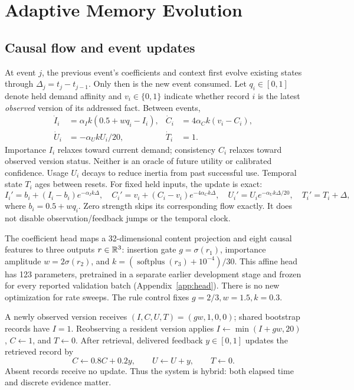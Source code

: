 \section{Adaptive Memory Evolution}\label{sec:method}
\subsection{Causal flow and event updates}
At event $j$, the previous event's coefficients and context first evolve existing states through $\Delta_j=t_j-t_{j-1}$. Only then is the new event consumed. Let $q_i\in[0,1]$ denote held demand affinity and $v_i\in\{0,1\}$ indicate whether record $i$ is the latest \emph{observed} version of its addressed fact. Between events,
\begin{align}
\dot I_i&=\alpha_I k(0.5+wq_i-I_i), &
\dot C_i&=4\alpha_C k(v_i-C_i),\label{eq:flow}\\
\dot U_i&=-\alpha_U kU_i/20, & \dot T_i&=1.\nonumber
\end{align}
Importance $I_i$ relaxes toward current demand; consistency $C_i$ relaxes toward observed version status. Neither is an oracle of future utility or calibrated confidence. Usage $U_i$ decays to reduce inertia from past successful use. Temporal state $T_i$ ages between resets. For fixed held inputs, the update is exact:
\begin{equation}\label{eq:closed}
I_i'=b_i+(I_i-b_i)e^{-\alpha_I k\Delta},\quad
C_i'=v_i+(C_i-v_i)e^{-4\alpha_C k\Delta},\quad
U_i'=U_ie^{-\alpha_U k\Delta/20},\quad T_i'=T_i+\Delta,
\end{equation}
where $b_i=0.5+wq_i$. Zero strength skips its corresponding flow exactly. It does not disable observation/feedback jumps or the temporal clock.

The coefficient head maps a 32-dimensional content projection and eight causal features to three outputs $r\in\mathbb{R}^3$: insertion gate $g=\sigma(r_1)$, importance amplitude $w=2\sigma(r_2)$, and $k=(\operatorname{softplus}(r_3)+10^{-4})/30$. This affine head has 123 parameters, pretrained in a separate earlier development stage and frozen for every reported validation batch (Appendix~\ref{app:head}). There is no new optimization for rate sweeps. The rule control fixes $g=2/3,w=1.5,k=0.3$.

A newly observed version receives $(I,C,U,T)=(gw,1,0,0)$; shared bootstrap records have $I=1$. Reobserving a resident version applies $I\leftarrow\min(I+gw,20)$, $C\leftarrow1$, and $T\leftarrow0$. After retrieval, delivered feedback $y\in[0,1]$ updates the retrieved record by
\begin{equation}
C\leftarrow0.8C+0.2y,\qquad U\leftarrow U+y,\qquad T\leftarrow0.
\end{equation}
Absent records receive no update. Thus the system is hybrid: both elapsed time and discrete evidence matter.

